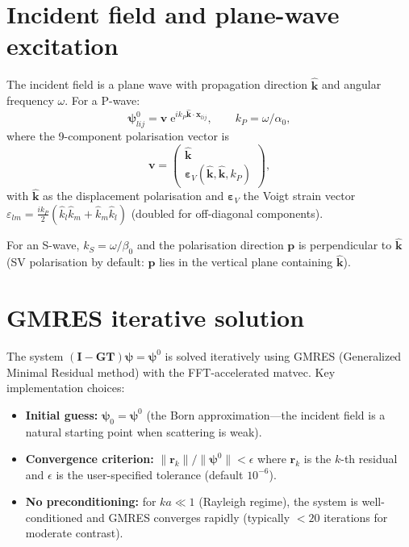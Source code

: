 \documentclass[11pt,a4paper]{article}
\newcommand{\bG}{\bm{G}}
\newcommand{\bT}{\bm{T}}
\newcommand{\bI}{\bm{I}}
\newcommand{\be}{\bm{\varepsilon}}
\newcommand{\hk}{\hat{\bm{k}}}
\newcommand{\ee}{\mathrm{e}}
\begin{document}
\section{Incident field and plane-wave excitation}
\label{sec:incident}

The incident field is a plane wave with propagation direction
$\hk$ and angular frequency $\omega$.  For a P-wave:
\begin{equation}
  \bm{\psi}^0_{lij} = \bm{v}\;\ee^{ik_P \hk \cdot \bm{x}_{lij}},
  \qquad
  k_P = \omega / \alpha_0,
\end{equation}
where the 9-component polarisation vector is
\begin{equation}\label{eq:inc_vec}
  \bm{v} = \begin{pmatrix} \hk \\ \be_V(\hk, \hk, k_P) \end{pmatrix},
\end{equation}
with $\hk$ as the displacement polarisation and
$\be_V$ the Voigt strain vector
$\varepsilon_{lm} = \tfrac{ik_P}{2}(\hat{k}_l \hat{k}_m
+ \hat{k}_m \hat{k}_l)$
(doubled for off-diagonal components).

For an S-wave, $k_S = \omega / \beta_0$ and the polarisation
direction $\bm{p}$ is perpendicular to $\hk$ (SV polarisation
by default: $\bm{p}$ lies in the vertical plane containing
$\hk$).

\section{GMRES iterative solution}
\label{sec:gmres}

The system $(\bI - \bG\bT)\bm{\psi} = \bm{\psi}^0$ is solved
iteratively using GMRES (Generalized Minimal Residual method) with
the FFT-accelerated matvec.  Key implementation choices:

\begin{itemize}[nosep]
  \item \textbf{Initial guess:} $\bm{\psi}_0 = \bm{\psi}^0$
    (the Born approximation---the incident field is a natural
    starting point when scattering is weak).
  \item \textbf{Convergence criterion:}
    $\|\bm{r}_k\| / \|\bm{\psi}^0\| < \epsilon$ where
    $\bm{r}_k$ is the $k$-th residual and $\epsilon$ is the
    user-specified tolerance (default $10^{-6}$).
  \item \textbf{No preconditioning:} for $ka \ll 1$ (Rayleigh
    regime), the system is well-conditioned and GMRES converges
    rapidly (typically $< 20$ iterations for moderate contrast).
\end{itemize}
\end{document}
